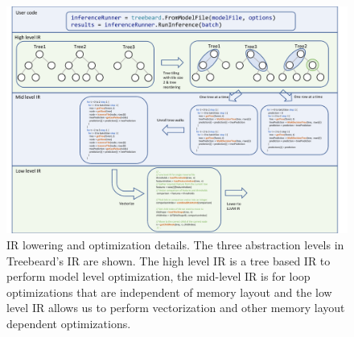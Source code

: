 \begin{figure}
  \centering
  \includegraphics[width=\textwidth]{figures/OverviewExample.pdf}
  \caption{\Treebeard{} IR lowering and optimization details. The three abstraction levels in Treebeard's IR are shown. The
           high level IR is a tree based IR to perform model level optimization, the mid-level IR is for
           loop optimizations that are independent of memory layout and the low level IR allows us to perform
           vectorization and other memory layout dependent optimizations.}
  \label{Fig:Overview}
\end{figure}




